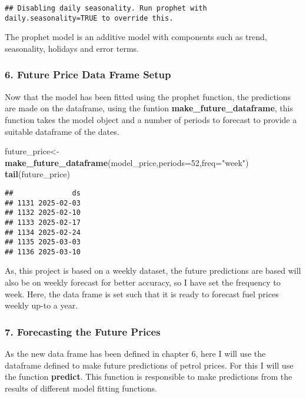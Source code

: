 \documentclass[
]{article}
\newenvironment{Shaded}{\begin{snugshade}}{\end{snugshade}}
\newcommand{\AttributeTok}[1]{\textcolor[rgb]{0.13,0.29,0.53}{#1}}
\newcommand{\DecValTok}[1]{\textcolor[rgb]{0.00,0.00,0.81}{#1}}
\newcommand{\FunctionTok}[1]{\textcolor[rgb]{0.13,0.29,0.53}{\textbf{#1}}}
\newcommand{\NormalTok}[1]{#1}
\newcommand{\OtherTok}[1]{\textcolor[rgb]{0.56,0.35,0.01}{#1}}
\newcommand{\StringTok}[1]{\textcolor[rgb]{0.31,0.60,0.02}{#1}}
\begin{document}
\begin{verbatim}
## Disabling daily seasonality. Run prophet with daily.seasonality=TRUE to override this.
\end{verbatim}

The prophet model is an additive model with components such as trend,
seasonality, holidays and error terms.

\hypertarget{future-price-data-frame-setup}{%
\subsubsection{6. Future Price Data Frame
Setup}\label{future-price-data-frame-setup}}

Now that the model has been fitted using the prophet function, the
predictions are made on the dataframe, using the funtion
\textbf{make\_future\_dataframe}, this function takes the model object
and a number of periods to forecast to provide a suitable dataframe of
the dates.

\begin{Shaded}
\begin{Highlighting}[]
\NormalTok{future\_price}\OtherTok{\textless{}{-}}\FunctionTok{make\_future\_dataframe}\NormalTok{(model\_price,}\AttributeTok{periods=}\DecValTok{52}\NormalTok{,}\AttributeTok{freq=}\StringTok{"week"}\NormalTok{)}
\FunctionTok{tail}\NormalTok{(future\_price)}
\end{Highlighting}
\end{Shaded}

\begin{verbatim}
##              ds
## 1131 2025-02-03
## 1132 2025-02-10
## 1133 2025-02-17
## 1134 2025-02-24
## 1135 2025-03-03
## 1136 2025-03-10
\end{verbatim}

As, this project is based on a weekly dataset, the future predictions
are based will also be on weekly forecast for better accuracy, so I have
set the frequency to week. Here, the data frame is set such that it is
ready to forecast fuel prices weekly up-to a year.

\hypertarget{forecasting-the-future-prices}{%
\subsubsection{7. Forecasting the Future
Prices}\label{forecasting-the-future-prices}}

As the new data frame has been defined in chapter 6, here I will use the
dataframe defined to make future predictions of petrol prices. For this
I will use the function \textbf{predict}. This function is responsible
to make predictions from the results of different model fitting
functions.
\end{document}
